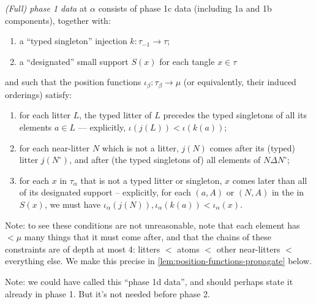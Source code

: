 \begin{definition}
  \label{def:full-phase-1-data}
  \emph{(Full) phase 1 data} at $\alpha$ consists of phase 1c data (including 1a and 1b components), together with:
  \begin{enumerate}
    \item a “typed singleton” injection $k : \tau_{-1} \to \tau$;
    \item a “designated” small support $S(x)$ for each tangle $x \in \tau$
  \end{enumerate}
  and such that the position functions $\iota_\beta : \tau_\beta \to \mu$ (or equivalently, their induced orderings) satisfy:
  \begin{enumerate}
    \item for each litter $L$, the typed litter of $L$ precedes the typed singletons of all its elements $a \in L$ --- explicitly, $\iota(j(L)) < \iota(k(a))$;
    \item for each near-litter $N$ which is not a litter, $j(N)$ comes after its (typed) litter $j(N^\circ)$, and after (the typed singletons of) all elements of $N \Delta N^\circ$;

    \item for each $x$ in $\tau_\alpha$ that is not a typed litter or singleton, $x$ comes later than all of its designated support -- explicitly, for each $(a,A)$ or $(N,A)$ in the in $S(x)$, we must have $\iota_\alpha(j(N)), \iota_\alpha(k(a))<\iota_\alpha(x)$.
  \end{enumerate}

  Note: to see these conditions are not unreasonable, note that each element has $<\mu$ many things that it must come after, and that the chains of these constraints are of depth at most 4: litters $<$ atoms $<$ other near-litters $<$ everything else.  We make this precise in \cref{lem:position-functions-propagate} below.

  Note: we could have called this “phase 1d data”, and should perhaps state it already in phase 1.  But it’s not needed before phase 2.
\end{definition}

